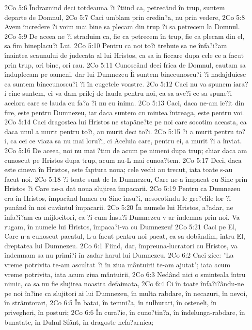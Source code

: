 2Co 5:6  Îndraznind deci totdeauna ?i ?tiind ca, petrecând în trup, suntem departe de Domnul,
2Co 5:7  Caci umblam prin credin?a, nu prin vedere,
2Co 5:8  Avem încredere ?i voim mai bine sa plecam din trup ?i sa petrecem la Domnul.
2Co 5:9  De aceea ne ?i straduim ca, fie ca petrecem în trup, fie ca plecam din el, sa fim bineplacu?i Lui.
2Co 5:10  Pentru ca noi to?i trebuie sa ne înfa?i?am înaintea scaunului de judecata al lui Hristos, ca sa ia fiecare dupa cele ce a facut prin trup, ori bine, ori rau.
2Co 5:11  Cunoscând deci frica de Domnul, cautam sa înduplecam pe oameni, dar lui Dumnezeu Îi suntem binecunoscu?i ?i nadajduiesc ca suntem binecunoscu?i ?i în cugetele voastre.
2Co 5:12  Caci nu va spunem iara?i cine suntem, ci va dam prilej de lauda pentru noi, ca sa ave?i ce sa spune?i acelora care se lauda cu fa?a ?i nu cu inima.
2Co 5:13  Caci, daca ne-am ie?it din fire, este pentru Dumnezeu, iar daca suntem cu mintea întreaga, este pentru voi.
2Co 5:14  Caci dragostea lui Hristos ne stapâne?te pe noi care socotim aceasta, ca daca unul a murit pentru to?i, au murit deci to?i.
2Co 5:15  ?i a murit pentru to?i, ca cei ce viaza sa nu mai loru?i, ci Aceluia care, pentru ei, a murit ?i a înviat.
2Co 5:16  De aceea, noi nu mai ?tim de acum pe nimeni dupa trup; chiar daca am cunoscut pe Hristos dupa trup, acum nu-L mai cunoa?tem.
2Co 5:17  Deci, daca este cineva în Hristos, este faptura noua; cele vechi au trecut, iata toate s-au facut noi.
2Co 5:18  ?i toate sunt de la Dumnezeu, Care ne-a împacat cu Sine prin Hristos ?i Care ne-a dat noua slujirea împacarii.
2Co 5:19  Pentru ca Dumnezeu era în Hristos, împacând lumea cu Sine însu?i, nesocotindu-le gre?elile lor ?i punând în noi cuvântul împacarii.
2Co 5:20  În numele lui Hristos, a?adar, ne înfa?i?am ca mijlocitori, ca ?i cum Însu?i Dumnezeu v-ar îndemna prin noi. Va rugam, în numele lui Hristos, împaca?i-va cu Dumnezeu!
2Co 5:21  Caci pe El, Care n-a cunoscut pacatul, L-a facut pentru noi pacat, ca sa dobândim, întru El, dreptatea lui Dumnezeu.
2Co 6:1  Fiind, dar, împreuna-lucratori cu Hristos, va îndemnam sa nu primi?i în zadar harul lui Dumnezeu.
2Co 6:2  Caci zice: "La vreme potrivita te-am ascultat ?i în ziua mântuirii te-am ajutat"; iata acum vreme potrivita, iata acum ziua mântuirii,
2Co 6:3  Nedând nici o sminteala întru nimic, ca sa nu fie slujirea noastra defaimata,
2Co 6:4  Ci în toate înfa?i?ându-ne pe noi în?ine ca slujitori ai lui Dumnezeu, în multa rabdare, în necazuri, în nevoi, în strâmtorari,
2Co 6:5  În batai, în temni?a, în tulburari, în osteneli, în privegheri, în posturi;
2Co 6:6  În cura?ie, în cuno?tin?a, în îndelunga-rabdare, în bunatate, în Duhul Sfânt, în dragoste nefa?arnica;
